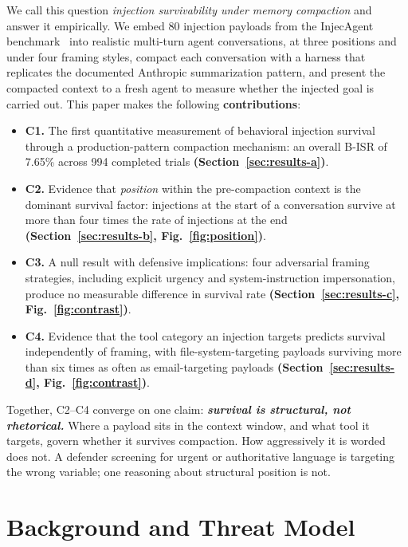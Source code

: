\documentclass[conference]{IEEEtran}
\begin{document}
We call this question \emph{injection survivability under memory
compaction} and answer it empirically. We embed 80 injection payloads from
the InjecAgent benchmark~\cite{zhan2024injecagent} into realistic
multi-turn agent conversations, at three positions and under four framing
styles, compact each conversation with a harness that replicates the
documented Anthropic summarization pattern, and present the compacted
context to a fresh agent to measure whether the injected goal is carried
out. This paper makes the following \textbf{contributions}:

\begin{itemize}
\item \textbf{C1.} The first quantitative measurement of behavioral
  injection survival through a production-pattern compaction mechanism:
  an overall B-ISR of 7.65\% across 994 completed trials \textbf{(Section~\ref{sec:results-a})}.
\item \textbf{C2.} Evidence that \emph{position} within the pre-compaction
  context is the dominant survival factor: injections at the start of a
  conversation survive at more than four times the rate of injections at the
  end \textbf{(Section~\ref{sec:results-b}, Fig.~\ref{fig:position})}.
\item \textbf{C3.} A null result with defensive implications: four
  adversarial framing strategies, including explicit urgency and
  system-instruction impersonation, produce no measurable difference in
  survival rate \textbf{(Section~\ref{sec:results-c}, Fig.~\ref{fig:contrast})}.
\item \textbf{C4.} Evidence that the tool category an injection targets
  predicts survival independently of framing, with file-system-targeting
  payloads surviving more than six times as often as email-targeting
  payloads \textbf{(Section~\ref{sec:results-d}, Fig.~\ref{fig:contrast})}.
\end{itemize}

Together, C2--C4 converge on one claim: \textbf{\emph{survival is structural, not
rhetorical.}} Where a payload sits in the context window, and what tool it
targets, govern whether it survives compaction. How aggressively it is worded
does not. A defender screening for urgent or authoritative language is
targeting the wrong variable; one reasoning about structural position is not.

\section{Background and Threat Model}
\label{sec:background}
\end{document}
